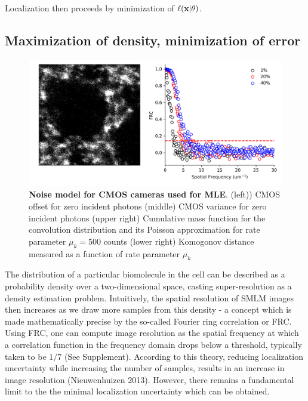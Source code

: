 Localization then proceeds by minimization of $\ell(\bold{x}\lvert\theta)$. 


\subsection{Maximization of density, minimization of error}

\begin{figure}[t]
\begin{center}
\includegraphics[width=14cm]{media/FRC.png}
\end{center}
\caption{\textbf{Noise model for CMOS cameras used for MLE}. (left)) CMOS offset for zero incident photons (middle) CMOS variance for zero incident photons (upper right) Cumulative mass function for the convolution distribution and its Poisson approximation for rate parameter $\mu_{k} = 500$ counts (lower right) Komogonov distance measured as a function of rate parameter $\mu_{k}$}
\end{figure}


The distribution of a particular biomolecule in the cell can be described as a probability density over a two-dimensional space, casting super-resolution as a density estimation problem. Intuitively, the spatial resolution of SMLM images then increases as we draw more samples from this density - a concept which is made mathematically precise by the so-called Fourier ring correlation or FRC. Using FRC, one can compute image resolution as the spatial frequency at which a correlation function in the frequency domain drops below a threshold, typically taken to be $1/7$ (See Supplement). According to this theory, reducing localization uncertainty while increasing the number of samples, results in an increase in image resolution (Nieuwenhuizen 2013). However, there remains a fundamental limit to the the minimal localization uncertainty which can be obtained.


